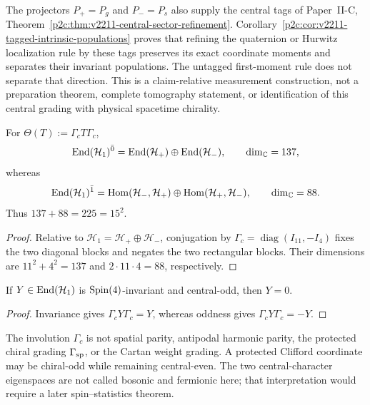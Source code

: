 \documentclass[12pt,a4paper]{article}
\begin{document}
The projectors $P_+=P_g$ and $P_-=P_s$ also supply the central tags of
Paper~II-C, Theorem~\ref{p2c:thm:v2211-central-sector-refinement}.
Corollary~\ref{p2c:cor:v2211-tagged-intrinsic-populations} proves that
refining the quaternion or Hurwitz localization rule by these tags preserves
its exact coordinate moments and separates their invariant populations.
The untagged first-moment rule does not separate that direction.  This is a
claim-relative measurement construction, not a preparation theorem, complete
tomography statement, or identification of this central grading with physical
spacetime chirality.

\begin{corollary}
\label{p2:cor:central-even-odd-operator-splitting}
For \(\Theta(T):=\Gamma_cT\Gamma_c\),
\[
 \operatorname{End}(\mathcal H_1)^{\bar0}
 =\operatorname{End}(\mathcal H_+)\oplus\operatorname{End}(\mathcal H_-),
 \qquad \dim_{\mathbb{C}}=137,
\]
whereas
\[
 \operatorname{End}(\mathcal H_1)^{\bar1}
 =\operatorname{Hom}(\mathcal H_-,\mathcal H_+)
 \oplus\operatorname{Hom}(\mathcal H_+,\mathcal H_-),
 \qquad \dim_{\mathbb{C}}=88.
\]
Thus \(137+88=225=15^2\).
\end{corollary}

\begin{proof}
Relative to \(\mathcal H_1=\mathcal H_+\oplus\mathcal H_-\), conjugation by
\(\Gamma_c=\operatorname{diag}(I_{11},-I_4)\) fixes the two diagonal blocks
and negates the two rectangular blocks.  Their dimensions are
\(11^2+4^2=137\) and \(2\cdot11\cdot4=88\), respectively.
\end{proof}

\begin{lemma}
\label{p2:lem:no-invariant-central-odd-bridge}
If \(Y\in\operatorname{End}(\mathcal H_1)\) is \(\mathrm{Spin}(4)\)-invariant and central-odd,
then \(Y=0\).
\end{lemma}

\begin{proof}
Invariance gives \(\Gamma_cY\Gamma_c=Y\), whereas oddness gives
\(\Gamma_cY\Gamma_c=-Y\).
\end{proof}

\begin{remark}
\label{p2:rem:diagonal-center-grading-distinction}
The involution \(\Gamma_c\) is not spatial parity, antipodal harmonic parity,
the protected chiral grading \(\Gamma_{\rm sp}\), or the Cartan weight
grading.  A protected Clifford coordinate may be chiral-odd while remaining
central-even.  The two central-character eigenspaces are not called bosonic
and fermionic here; that interpretation would require a later spin--statistics
theorem.
\end{remark}
\end{document}
